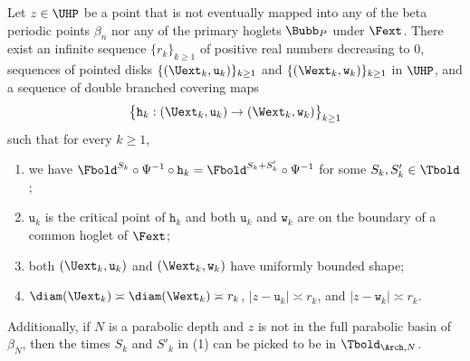 \documentclass{amsart}
\begin{document}
\begin{lemma}
\label{lem:non-linearity-2}
    Let $z \in \UHP$ be a point that is not eventually mapped into any of the beta periodic points $\beta_n$ nor any of the primary hoglets $\Bubb_P$ under $\Fext$. 
    There exist an infinite sequence $\{r_k\}_{k \geq 1}$ of positive real numbers decreasing to $0$, sequences of pointed disks $\{(\Uext_k, \mathtt{u}_k)\}_{k \geq 1}$ and $\{(\Wext_k, \mathtt{w}_k)\}_{k \geq 1}$ in $\UHP$, and a sequence of double branched covering maps 
    \[
        \big\{ \mathtt{h}_k : (\Uext_k, \mathtt{u}_k) \to (\Wext_k, \mathtt{w}_k) \big\}_{k\geq 1}
    \]
    such that for every $k \geq 1$,
    \begin{enumerate}
        \item we have $\Fbold^{S_k} \circ \Psi^{-1} \circ \mathtt{h}_k = \Fbold^{S_k + S'_k} \circ \Psi^{-1}$ for some $S_k, S'_k \in \Tbold$;
        \item $\mathtt{u}_k$ is the critical point of $\mathtt{h}_k$ and both $\mathtt{u}_k$ and $\mathtt{w}_k$ are on the boundary of a common hoglet of $\Fext$;
        \item both $(\Uext_k, \mathtt{u}_k)$ and $(\Wext_k, \mathtt{w}_k)$ have uniformly bounded shape;
        \item $\diam(\Uext_k) \asymp \diam(\Wext_k) \asymp r_k$, 
        $|z - \mathtt{u}_k| \asymp r_k$, 
        and $|z - \mathtt{w}_k| \asymp r_k$.
    \end{enumerate}
    Additionally, if $N$ is a parabolic depth and $z$ is not in the full parabolic basin of $\beta_N$, then the times $S_k$ and $S'_k$ in \textnormal{(1)} can be picked to be in $\Tbold_{\Arch,N}$.
\end{lemma}
\end{document}

